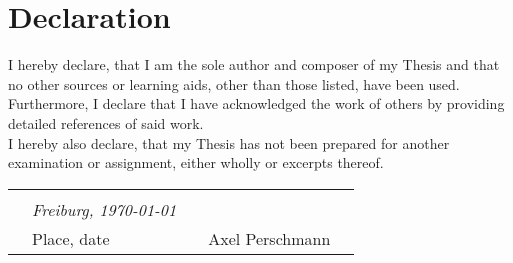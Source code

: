 \section*{Declaration}

I hereby declare, that I am the sole author and composer of my Thesis and that no other sources or learning aids, other than those listed, have been used. Furthermore, I declare that I have acknowledged the work of others by providing detailed references of said work.\\
I hereby also declare, that my Thesis has not been prepared for another examination
or assignment, either wholly or excerpts thereof.
\vspace{3cm}


\begin{tabular}{p{10mm}>{\centering\arraybackslash}p{50mm}p{10mm}
>{\centering\arraybackslash}p{50mm}p{10mm}}
&\textit{\large}&&& \\
&\textit{\large Freiburg, \today}&&\hrulefill& \\
&\small Place, date&&\small Axel Perschmann&
\end{tabular}

\clearpage{}